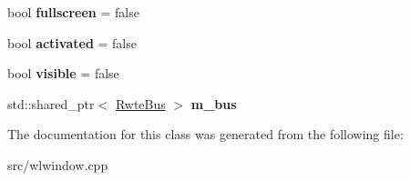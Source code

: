 \begin{DoxyCompactItemize}
bool {\bfseries fullscreen} = false
\item 
\mbox{\label{classWlWindow_a950fa8fa2138657e910e7bc23b6e40d2}} 
bool {\bfseries activated} = false
\item 
\mbox{\label{classWlWindow_af313c8d0f5b4a81b4606c60e16814185}} 
bool {\bfseries visible} = false
\item 
\mbox{\label{classWlWindow_a170f4ba8f11530e934f816913ac6f022}} 
std\+::shared\+\_\+ptr$<$ \mbox{\hyperlink{classBus}{Rwte\+Bus}} $>$ {\bfseries m\+\_\+bus}
\end{DoxyCompactItemize}


The documentation for this class was generated from the following file\+:\begin{DoxyCompactItemize}
\item 
src/wlwindow.\+cpp\end{DoxyCompactItemize}
